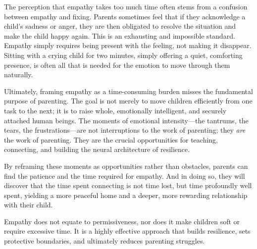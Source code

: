 The perception that empathy takes too much time often stems from a confusion between empathy and fixing.
Parents sometimes feel that if they acknowledge a child's sadness or anger, they are then obligated to resolve the situation and make the child happy again.
This is an exhausting and impossible standard.
Empathy simply requires being present with the feeling, not making it disappear.
Sitting with a crying child for two minutes, simply offering a quiet, comforting presence, is often all that is needed for the emotion to move through them naturally.

Ultimately, framing empathy as a time-consuming burden misses the fundamental purpose of parenting.
The goal is not merely to move children efficiently from one task to the next; it is to raise whole, emotionally intelligent, and securely attached human beings.
The moments of emotional intensity---the tantrums, the tears, the frustrations---are not interruptions to the work of parenting; they \textit{are} the work of parenting.
They are the crucial opportunities for teaching, connecting, and building the neural architecture of resilience.

By reframing these moments as opportunities rather than obstacles, parents can find the patience and the time required for empathy.
And in doing so, they will discover that the time spent connecting is not time lost, but time profoundly well spent, yielding a more peaceful home and a deeper, more rewarding relationship with their child.

\begin{keyinsight}
Empathy does not equate to permissiveness, nor does it make children soft or require excessive time.
It is a highly effective approach that builds resilience, sets protective boundaries, and ultimately reduces parenting struggles.
\end{keyinsight}

\newpage
